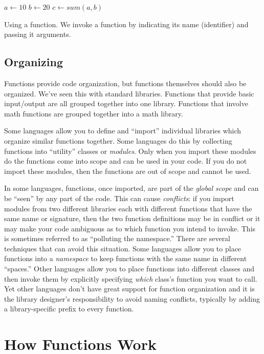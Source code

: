 \begin{algorithm}[H]
$a \leftarrow 10$ \;
$b \leftarrow 20$ \;
$c \leftarrow sum(a, b)$ \;
\caption[Using a function]{Using a function.  We invoke a function by 
indicating its name (identifier) and passing it arguments.}
\label{algorithm:functionCall}
\end{algorithm}

\subsection{Organizing}   

Functions provide code organization, but functions themselves should also
be organized.  We've seen this with standard libraries.  Functions that provide
basic input/output are all grouped together into one library.  
Functions that involve math functions are grouped together into a math library.

Some languages allow you to define and ``import'' individual libraries 
which organize similar functions together.  Some languages do this by 
collecting functions into ``utility'' classes or \emph{modules}.  Only when
you import these modules do the functions come into scope and can be
used in your code.  If you do not import these modules, then the functions
are out of scope and cannot be used.  

In some languages, functions, once imported, are part of the \emph{global
scope} and can be ``seen'' by any part of the code.  This can cause
\emph{conflicts}: if you import modules from two different libraries each
with different functions that have the same name or signature, then 
the two function definitions may be in conflict or it may make your
code ambiguous as to which function you intend to invoke.  This is
sometimes referred to as ``polluting the namespace.''  There are
several techniques that can avoid this situation.  Some languages allow
you to place functions into a \emph{namespace} to keep functions with
the same name in different ``spaces.''  Other languages allow you to 
place functions into different classes and then invoke them by explicitly
specifying \emph{which} class's function you want to call.  Yet other
languages don't have great support for function organization and it is
the library designer's responsibility to avoid naming conflicts, typically
by adding a library-specific prefix to every function.

\section{How Functions Work}

